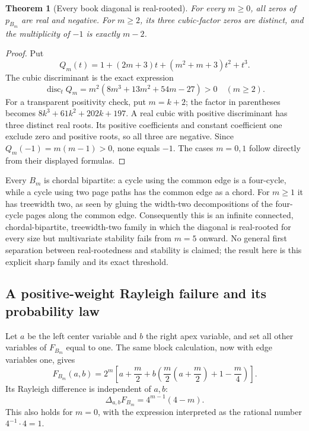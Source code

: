 \documentclass[11pt]{article}
\numberwithin{equation}{section}
\newtheorem{theorem}{Theorem}[section]
\theoremstyle{definition}
\newcommand{\disc}{\operatorname{disc}}
\newcommand{\del}{\Delta}
\begin{document}
\begin{theorem}[Every book diagonal is real-rooted]
\label{ade:thm:bookreal}
For every $m\ge0$, all zeros of $p_{B_m}$ are real and negative.
For $m\ge2$, its three cubic-factor zeros are distinct, and the
multiplicity of $-1$ is exactly $m-2$.
\end{theorem}
\begin{proof}
Put
\[
 Q_m(t)=1+(2m+3)t+(m^2+m+3)t^2+t^3.
\]
The cubic discriminant is the exact expression
\begin{equation}
 \disc_t Q_m=m^2(8m^3+13m^2+54m-27)>0
 \quad(m\ge2).
 \label{ade:eq:cubicdisc}
\end{equation}
For a transparent positivity check, put $m=k+2$; the factor in parentheses
becomes $8k^3+61k^2+202k+197$.
A real cubic with positive discriminant has three distinct real roots.
Its positive coefficients and constant coefficient one exclude zero and
positive roots, so all three are negative.
Since $Q_m(-1)=m(m-1)>0$, none equals $-1$.
The cases $m=0,1$ follow directly from their displayed formulas.
\end{proof}

Every $B_m$ is chordal bipartite: a cycle using the common edge is a
four-cycle, while a cycle using two page paths has the common edge as a
chord.  For $m\ge1$ it has treewidth two, as seen by gluing the
width-two decompositions of the four-cycle pages along the common edge.
Consequently this is an infinite connected, chordal-bipartite,
treewidth-two family in which the diagonal is real-rooted for every size
but multivariate stability fails from $m=5$ onward.  No general first
separation between real-rootedness and stability is claimed; the result
here is this explicit sharp family and its exact threshold.

\subsection{A positive-weight Rayleigh failure and its probability law}

Let $a$ be the left center variable and $b$ the right apex variable, and
set all other variables of $F_{B_m}$ equal to one.  The same block
calculation, now with edge variables one, gives
\begin{equation}
 F_{B_m}(a,b)=2^m\left[
 a+\frac m2+b\left(\frac m2\left(a+\frac m2\right)
                       +1-\frac m4\right)\right].
 \label{ade:eq:bookbivariate}
\end{equation}
Its Rayleigh difference is independent of $a,b$:
\begin{equation}
 \boxed{\quad\del_{a,b}F_{B_m}=4^{m-1}(4-m).\quad}
 \label{ade:eq:bookdelta}
\end{equation}
This also holds for $m=0$, with the expression interpreted as the rational
number $4^{-1}\cdot4=1$.
\end{document}
